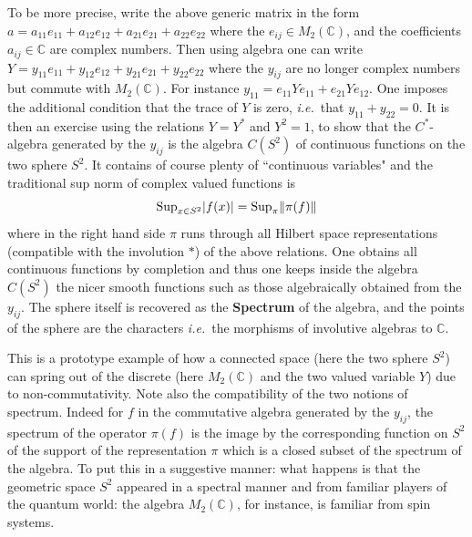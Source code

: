 \documentclass[12pt]{article}
\def\C{{\mathbb C}}
\newcommand{\ie}{{\it i.e.\/}\ }
\begin{document}
To be more precise, write the above generic matrix in the form $a= a_{11} e_{11}+a_{12} e_{12}+a_{21} e_{21}+a_{22} e_{22}$ where the $e_{ij}\in M_2(\C)$, and the coefficients $a_{ij}\in\C$ are complex numbers. Then using algebra one can write  $Y= y_{11} e_{11}+y_{12} e_{12}+y_{21} e_{21}+y_{22} e_{22}$ where the $y_{ij}$ are no longer complex numbers but commute with $M_2(\C)$. For instance $y_{11}=e_{11} Y e_{11}+e_{21} Y e_{12}$.  One imposes the additional condition that the trace of $Y$ is zero, \ie that $y_{11}+y_{22}=0$. It is then an exercise using the relations $Y=Y^*$ and $Y^2=1$, to show that the $C^*$-algebra generated by the $y_{ij}$ is the algebra $C(S^2)$ of continuous functions on the two sphere $S^2$. It contains of course plenty of ``continuous variables" and the traditional sup norm of complex valued functions is 
$$
{\rm Sup}_{x\in S^2} \vert f(x)\vert = {\rm Sup}_\pi \Vert \pi(f)\Vert 
$$
where in the right hand side $\pi$ runs through all Hilbert space representations (compatible with the involution $*$) of the above relations. One obtains all continuous functions by completion and thus one keeps inside the algebra $C(S^2)$ the nicer smooth functions such as those algebraically obtained from the $y_{ij}$. The sphere itself is recovered as the {\bf Spectrum} of the algebra, and the points of the sphere are the characters \ie the morphisms of involutive algebras to $\C$. 

This is a prototype example of how a connected space (here the two sphere $S^2$) can spring out of the discrete (here $M_2(\C)$ and the two valued variable $Y$) due to non-commutativity. Note also the compatibility of the two notions of spectrum. Indeed for $f$ in the commutative algebra generated by the $y_{ij}$, the spectrum of the operator $\pi(f)$ is the image by the corresponding function on $S^2$ of the support of the representation $\pi$ which is a closed subset of the spectrum of the algebra.
To put this in a suggestive manner: what happens is that the geometric space $S^2$ appeared in a spectral manner and from familiar players of the quantum world: the algebra $M_2(\C)$, for instance, is familiar from spin systems.
\end{document}

